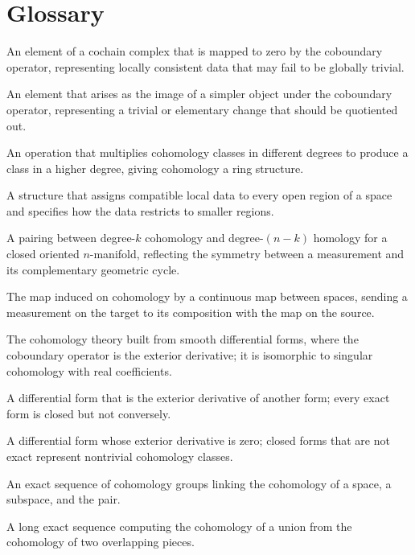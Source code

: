 \section*{Glossary}
\begin{description}[leftmargin=*,style=nextline,itemsep=0.3em]
\item[\textbf{Cocycle.}] An element of a cochain complex that is mapped to zero by the coboundary operator, representing locally consistent data that may fail to be globally trivial.
\item[\textbf{Coboundary.}] An element that arises as the image of a simpler object under the coboundary operator, representing a trivial or elementary change that should be quotiented out.
\item[\textbf{Cup product.}] An operation that multiplies cohomology classes in different degrees to produce a class in a higher degree, giving cohomology a ring structure.
\item[\textbf{Sheaf.}] A structure that assigns compatible local data to every open region of a space and specifies how the data restricts to smaller regions.
\item[\textbf{Poincaré duality.}] A pairing between degree-$k$ cohomology and degree-$(n-k)$ homology for a closed oriented $n$-manifold, reflecting the symmetry between a measurement and its complementary geometric cycle.
\item[\textbf{Pullback.}] The map induced on cohomology by a continuous map between spaces, sending a measurement on the target to its composition with the map on the source.
\item[\textbf{de Rham cohomology.}] The cohomology theory built from smooth differential forms, where the coboundary operator is the exterior derivative; it is isomorphic to singular cohomology with real coefficients.
\item[\textbf{Exact form.}] A differential form that is the exterior derivative of another form; every exact form is closed but not conversely.
\item[\textbf{Closed form.}] A differential form whose exterior derivative is zero; closed forms that are not exact represent nontrivial cohomology classes.
\item[\textbf{Long exact sequence.}] An exact sequence of cohomology groups linking the cohomology of a space, a subspace, and the pair.
\item[\textbf{Mayer-Vietoris sequence.}] A long exact sequence computing the cohomology of a union from the cohomology of two overlapping pieces.
\end{description}

